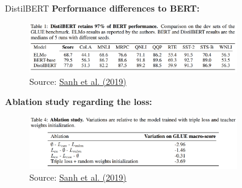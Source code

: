 \begin{frame}{DistilBERT \href{https://arxiv.org/pdf/1910.01108.pdf}{}}
\small
	\textbf{Performance differences to BERT:}

	\begin{figure}
		\centering
		\includegraphics[width = 9cm]{figure/distilbert-vs-sota.png}\\ 
		\footnotesize{Source:} \href{https://arxiv.org/pdf/1910.01108.pdf}{\footnotesize Sanh et al. (2019)}
	\end{figure}

	\textbf{Ablation study regarding the loss:}

	\begin{figure}
		\centering
		\includegraphics[width = 9cm]{figure/distilbert-ablation.png}\\ 
		\footnotesize{Source:} \href{https://arxiv.org/pdf/1910.01108.pdf}{\footnotesize Sanh et al. (2019)}
	\end{figure}
	
\end{frame}


\endlecture

